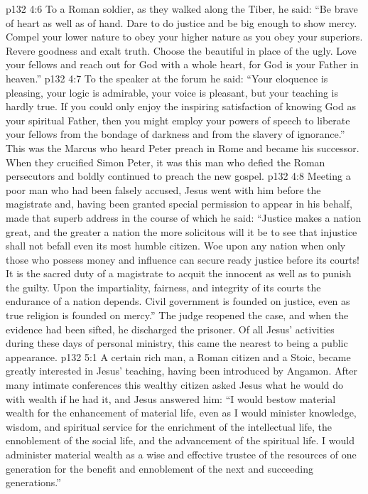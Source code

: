 \pc \vs p132 4:6 To a Roman soldier, as they walked along the Tiber, he said: \textcolor{ubdarkred}{“Be brave of heart as well as of hand. Dare to do justice and be big enough to show mercy. Compel your lower nature to obey your higher nature as you obey your superiors. Revere goodness and exalt truth. Choose the beautiful in place of the ugly. Love your fellows and reach out for God with a whole heart, for God is your Father in heaven.”}
\pc \vs p132 4:7 To the speaker at the forum he said: \textcolor{ubdarkred}{“Your eloquence is pleasing, your logic is admirable, your voice is pleasant, but your teaching is hardly true. If you could only enjoy the inspiring satisfaction of knowing God as your spiritual Father, then you might employ your powers of speech to liberate your fellows from the bondage of darkness and from the slavery of ignorance.”} This was the Marcus who heard Peter preach in Rome and became his successor. When they crucified Simon Peter, it was this man who defied the Roman persecutors and boldly continued to preach the new gospel.
\pc \vs p132 4:8 Meeting a poor man who had been falsely accused, Jesus went with him before the magistrate and, having been granted special permission to appear in his behalf, made that superb address in the course of which he said: \textcolor{ubdarkred}{“Justice makes a nation great, and the greater a nation the more solicitous will it be to see that injustice shall not befall even its most humble citizen. Woe upon any nation when only those who possess money and influence can secure ready justice before its courts! It is the sacred duty of a magistrate to acquit the innocent as well as to punish the guilty. Upon the impartiality, fairness, and integrity of its courts the endurance of a nation depends. Civil government is founded on justice, even as true religion is founded on mercy.”} The judge reopened the case, and when the evidence had been sifted, he discharged the prisoner. Of all Jesus’ activities during these days of personal ministry, this came the nearest to being a public appearance.\plusone
{}
\vs p132 5:1 A certain rich man, a Roman citizen and a Stoic, became greatly interested in Jesus’ teaching, having been introduced by Angamon. After many intimate conferences this wealthy citizen asked Jesus what he would do with wealth if he had it, and Jesus answered him: \textcolor{ubdarkred}{“I would bestow material wealth for the enhancement of material life, even as I would minister knowledge, wisdom, and spiritual service for the enrichment of the intellectual life, the ennoblement of the social life, and the advancement of the spiritual life. I would administer material wealth as a wise and effective trustee of the resources of one generation for the benefit and ennoblement of the next and succeeding generations.”}
